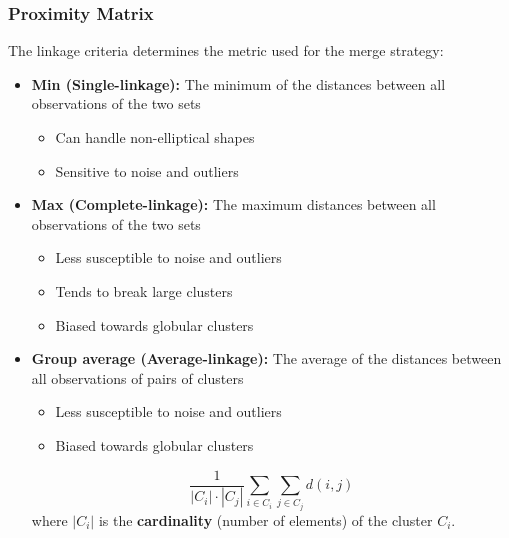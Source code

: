 \documentclass[aspectratio=169, 10pt]{beamer}
\begin{document}
\begin{frame}
    \frametitle{Proximity Matrix}
    \small

    The linkage criteria determines the metric used for the merge strategy:

    \begin{itemize}
        \item \textbf{Min (Single-linkage):} The minimum of the distances between all observations of the two sets
            \begin{itemize}
                \item Can handle non-elliptical shapes
                \item Sensitive to noise and outliers
            \end{itemize}
        \item \textbf{Max (Complete-linkage):} The maximum distances between all observations of the two sets
            \begin{itemize}
                \item Less susceptible to noise and outliers
                \item Tends to break large clusters
                \item Biased towards globular clusters
            \end{itemize}
        \item \textbf{Group average (Average-linkage):} The average of the distances between all observations of pairs of clusters
            \begin{itemize}
                \item Less susceptible to noise and outliers
                \item Biased towards globular clusters
            \end{itemize}
            \begin{equation*}
                \frac{1}{|C_i| \cdot |C_j|} \sum_{i \in C_i} \sum_{j \in C_j} d(i, j)
            \end{equation*}
            where $|C_i|$ is the \textbf{cardinality} (number of elements) of the cluster $C_i$.
    \end{itemize}
    
\end{frame}
\end{document}
